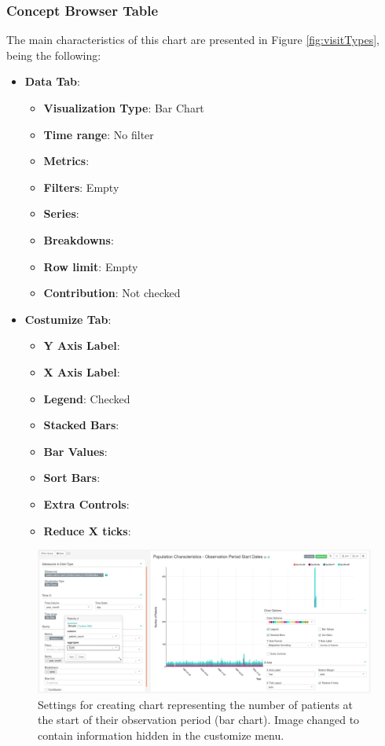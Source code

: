 \documentclass[]{book}
\providecommand{\tightlist}{%
  \setlength{\itemsep}{0pt}\setlength{\parskip}{0pt}}
\begin{document}
\subsubsection{Concept Browser Table}\label{concept-browser-table}

The main characteristics of this chart are presented in Figure
\ref{fig:visitTypes}, being the following:

\begin{itemize}
\tightlist
\item
  \textbf{Data Tab}:

  \begin{itemize}
  \tightlist
  \item
    \textbf{Visualization Type}: Bar Chart
  \item
    \textbf{Time range}: No filter
  \item
    \textbf{Metrics}:
  \item
    \textbf{Filters}: Empty
  \item
    \textbf{Series}:
  \item
    \textbf{Breakdowns}:
  \item
    \textbf{Row limit}: Empty
  \item
    \textbf{Contribution}: Not checked
  \end{itemize}
\item
  \textbf{Costumize Tab}:

  \begin{itemize}
  \tightlist
  \item
    \textbf{Y Axis Label}:
  \item
    \textbf{X Axis Label}:
  \item
    \textbf{Legend}: Checked
  \item
    \textbf{Stacked Bars}:
  \item
    \textbf{Bar Values}:
  \item
    \textbf{Sort Bars}:
  \item
    \textbf{Extra Controls}:
  \item
    \textbf{Reduce X ticks}:
  \end{itemize}
\end{itemize}

\begin{figure}
\includegraphics[width=1\linewidth]{images/populationCharacteristicsObservationPeriodStartDates} \caption{Settings for creating chart representing the number of patients at the start of their observation period (bar chart). Image changed to contain information hidden in the customize menu.}\label{fig:visitTypes3}
\end{figure}
\end{document}
